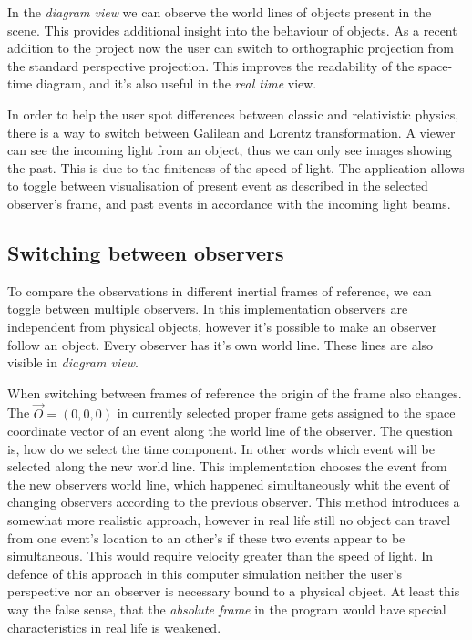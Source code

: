 \documentclass{egpubl}
\begin{document}
In the \emph{diagram view} we can observe the world lines of objects present in the scene. This provides additional insight into the behaviour of objects. As a recent addition to the project now the user can switch to orthographic projection from the standard perspective projection. This improves the readability of the space-time diagram, and it's also useful in the \emph{real time} view.

In order to help the user spot differences between classic and relativistic physics, there is a way to switch between Galilean \cite{KHGalilei} and Lorentz transformation. A viewer can see the incoming light from an object, thus we can only see images showing the past. This is due to the finiteness of the speed of light. The application allows to toggle between visualisation of present event as described in the selected observer's frame, and past events in accordance with the incoming light beams.

\subsection{Switching between observers}
To compare the observations in different inertial frames of reference, we can toggle between multiple observers. In this implementation observers are independent from physical objects, however it's possible to make an observer follow an object. Every observer has it's own world line. These lines are also visible in \emph{diagram view}.

When switching between frames of reference the origin of the frame also changes. The $\vec{O} =(0,0,0)$ in currently selected proper frame gets assigned to the space coordinate vector of an event along the world line of the observer. The question is, how do we select the time component. In other words which event will be selected along the new world line. This implementation chooses the event from the new observers world line, which happened simultaneously whit the event of changing observers according to the previous observer. This method introduces a somewhat more realistic approach, however in real life still no object can travel from one event's location to an other's if these two events appear to be simultaneous. This would require velocity greater than the speed of light. In defence of this approach in this computer simulation neither the user's perspective nor an observer is necessary bound to a physical object. At least this way the false sense, that the \emph{absolute frame} in the program would have special characteristics in real life is weakened.
\end{document}
